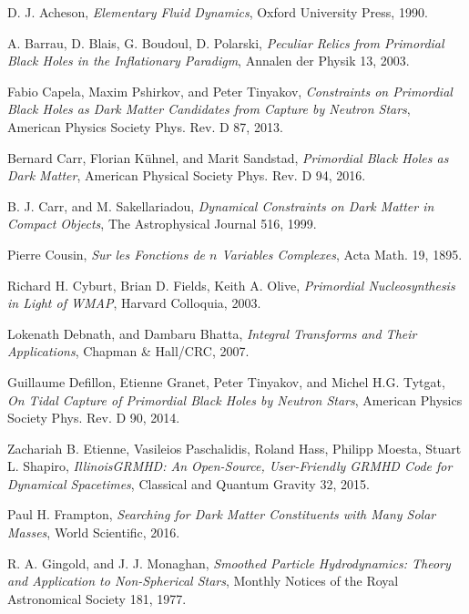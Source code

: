 \documentclass{jthesis}
\begin{document}



\begin{thebibliography}{99}

D. J. Acheson, \emph{Elementary Fluid Dynamics}, Oxford University Press, 1990.

A. Barrau, D. Blais, G. Boudoul, D. Polarski, \emph{Peculiar Relics from Primordial Black Holes in the Inflationary Paradigm}, Annalen der Physik 13, 2003.

Fabio Capela, Maxim Pshirkov, and Peter Tinyakov, \emph{Constraints on Primordial Black Holes as Dark Matter Candidates from Capture by Neutron Stars}, American Physics Society Phys. Rev. D 87, 2013.

Bernard Carr, Florian K{\"u}hnel, and Marit Sandstad, \emph{Primordial Black Holes as Dark Matter}, American Physical Society Phys. Rev. D 94, 2016.

B. J. Carr, and M. Sakellariadou, \emph{Dynamical Constraints on Dark Matter in Compact Objects}, The Astrophysical Journal 516, 1999.

Pierre Cousin, \emph{Sur les Fonctions de $n$ Variables Complexes}, Acta Math. 19, 1895.

Richard H. Cyburt, Brian D. Fields, Keith A. Olive, \emph{Primordial Nucleosynthesis in Light of WMAP}, Harvard Colloquia, 2003.

Lokenath Debnath, and Dambaru Bhatta, \emph{Integral Transforms and Their Applications}, Chapman \& Hall/CRC, 2007.

Guillaume Defillon, Etienne Granet, Peter Tinyakov, and Michel H.G. Tytgat, \emph{On Tidal Capture of Primordial Black Holes by Neutron Stars}, American Physics Society Phys. Rev. D 90, 2014.

Zachariah B. Etienne, Vasileios Paschalidis, Roland Hass, Philipp Moesta, Stuart L. Shapiro, \emph{IllinoisGRMHD: An Open-Source, User-Friendly GRMHD Code for Dynamical Spacetimes}, Classical and Quantum Gravity 32, 2015.

Paul H. Frampton, \emph{Searching for Dark Matter Constituents with Many Solar Masses}, World Scientific, 2016.

R. A. Gingold, and J. J. Monaghan, \emph{Smoothed Particle Hydrodynamics: Theory and Application to Non-Spherical Stars}, Monthly Notices of the Royal Astronomical Society 181, 1977.


\end{thebibliography}
\end{document}
